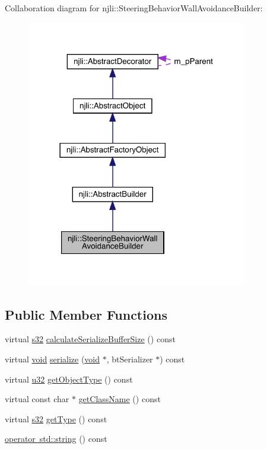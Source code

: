 Collaboration diagram for njli\+:\+:Steering\+Behavior\+Wall\+Avoidance\+Builder\+:\nopagebreak
\begin{figure}[H]
\begin{center}
\leavevmode
\includegraphics[width=273pt]{classnjli_1_1_steering_behavior_wall_avoidance_builder__coll__graph}
\end{center}
\end{figure}
\subsection*{Public Member Functions}
\begin{DoxyCompactItemize}
\item 
virtual \mbox{\hyperlink{_util_8h_aa62c75d314a0d1f37f79c4b73b2292e2}{s32}} \mbox{\hyperlink{classnjli_1_1_steering_behavior_wall_avoidance_builder_ac7188fa4580e7f9e302f54bc3e6ce63a}{calculate\+Serialize\+Buffer\+Size}} () const
\item 
virtual \mbox{\hyperlink{_thread_8h_af1e856da2e658414cb2456cb6f7ebc66}{void}} \mbox{\hyperlink{classnjli_1_1_steering_behavior_wall_avoidance_builder_a784cb4aaf2b005480cf1b398f87a04ed}{serialize}} (\mbox{\hyperlink{_thread_8h_af1e856da2e658414cb2456cb6f7ebc66}{void}} $\ast$, bt\+Serializer $\ast$) const
\item 
virtual \mbox{\hyperlink{_util_8h_a10e94b422ef0c20dcdec20d31a1f5049}{u32}} \mbox{\hyperlink{classnjli_1_1_steering_behavior_wall_avoidance_builder_a5156840678be5d63230262338d8bf755}{get\+Object\+Type}} () const
\item 
virtual const char $\ast$ \mbox{\hyperlink{classnjli_1_1_steering_behavior_wall_avoidance_builder_a949132ba8e4c910935763c0d14ad5656}{get\+Class\+Name}} () const
\item 
virtual \mbox{\hyperlink{_util_8h_aa62c75d314a0d1f37f79c4b73b2292e2}{s32}} \mbox{\hyperlink{classnjli_1_1_steering_behavior_wall_avoidance_builder_a3e69a1c879c2bb98778cbb779a9ee4e6}{get\+Type}} () const
\item 
\mbox{\hyperlink{classnjli_1_1_steering_behavior_wall_avoidance_builder_a070082058461628d11195f06f8f3b8a3}{operator std\+::string}} () const
\end{DoxyCompactItemize}
